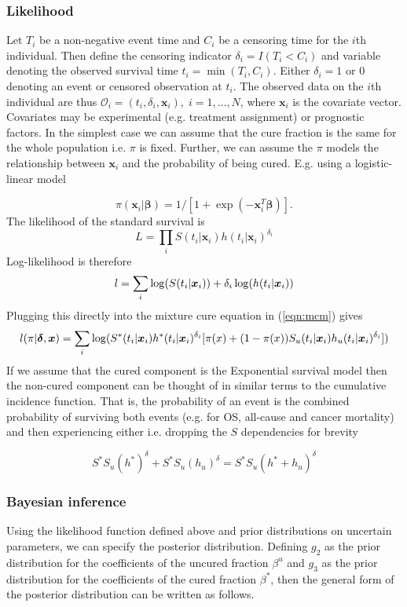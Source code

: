 \documentclass[AMA,STIX1COL]{WileyNJD-v2}
\begin{document}
\subsubsection{Likelihood}
Let $T_i$ be a non-negative event time and $C_i$ be a censoring time for the $i$th individual. Then define the censoring indicator $\delta_i = I(T_i < C_i)$ and variable denoting the observed survival time $t_i = \min(T_i, C_i)$. Either $\delta_i = 1$ or $0$ denoting an event or censored observation at $t_i$. The observed data on the $i$th individual are thus $\mathcal{O}_i = (t_i, \delta_i, \boldsymbol{x}_i),\; i = 1, \ldots, N$, where $\boldsymbol{x}_i$ is the covariate vector.
Covariates may be experimental (e.g. treatment assignment) or prognostic factors.
In the simplest case we can assume that the cure fraction is the same
for the whole population i.e. $\pi$ is fixed. Further, we can assume the
$\pi$ models the relationship between $\boldsymbol{x}_i$ and the
probability of being cured. E.g. using a logistic-linear model

$$
\pi(\boldsymbol{x}_i | \boldsymbol{\beta}) = 1/[1 + \exp(-\boldsymbol{x}_i^T \boldsymbol{\beta})].
$$
The likelihood of the standard survival is
$$
L = \prod_i S(t_i | \boldsymbol{x}_i) h(t_i | \boldsymbol{x}_i)^{\delta_i}
$$
Log-likelihood is therefore
$$
\mathnormal{l} = \sum_i \log(S(t_i | \boldsymbol{x}_i)) + \delta_i \log(h(t_i | \boldsymbol{x}_i))
$$
Plugging this directly into the mixture cure equation in (\ref{eqn:mcm}) gives
$$
\mathnormal{l}(\pi | \boldsymbol{\delta}, \boldsymbol{x}) =
 \sum_i \log(S^*(t_i | \boldsymbol{x}_i) h^*(t_i | \boldsymbol{x}_i)^{\delta_i}[\pi(x) +
   (1 - \pi(x)) S_u(t_i | \boldsymbol{x}_i) h_u(t_i | \boldsymbol{x}_i)^{\delta_i}])
$$
If we assume that the cured component is the Exponential survival model
then the non-cured component can be thought of in similar terms to the
cumulative incidence function. That is, the probability of an event is
the combined probability of surviving both events (e.g. for OS,
all-cause and cancer mortality) and then experiencing either i.e.
dropping the $S$ dependencies for brevity

\begin{equation}
\label{eqn:surv_pdf_exp}
S^* S_u (h^*)^{\delta} + S^* S_u (h_u)^{\delta} = S^* S_u (h^* + h_u)^{\delta}
\end{equation}

\subsubsection{Bayesian inference}
Using the likelihood function defined above and prior distributions on
uncertain parameters, we can specify the posterior distribution.
Defining $g_2$ as the prior distribution for the coefficients of the
uncured fraction $\beta^u$ and $g_3$ as the prior distribution for the
coefficients of the cured fraction $\beta^*$, then the general form of
the posterior distribution can be written as follows.
\end{document}
